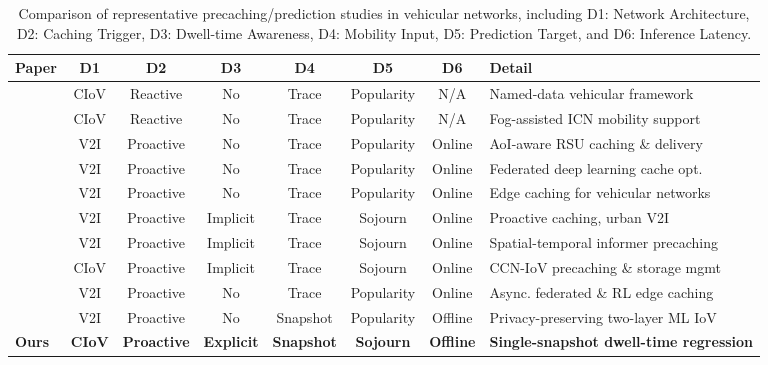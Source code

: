 \documentclass[journal]{IEEEtran}
\begin{document}
\begin{table}[!t]
\centering
\caption{Comparison of representative precaching/prediction studies in vehicular networks, including D1: Network Architecture, D2: Caching Trigger, D3: Dwell-time Awareness, D4: Mobility Input, D5: Prediction Target, and D6: Inference Latency.}
\label{tab:related_work}
\begin{tabular}{@{}lccccccl@{}}
\toprule
\textbf{Paper} & \textbf{D1} & \textbf{D2} & \textbf{D3} & \textbf{D4} & \textbf{D5} & \textbf{D6} & \textbf{Detail} \\
\midrule
\cite{su2017}  & CIoV & Reactive  & No  & Trace    & Popularity & N/A     & Named-data vehicular framework \\
\cite{wang2017}  & CIoV & Reactive  & No  & Trace    & Popularity & N/A     & Fog-assisted ICN mobility support \\
\cite{park2024} & V2I  & Proactive & No  & Trace    & Popularity & Online  & AoI-aware RSU caching \& delivery \\
\cite{khan2025_2} & V2I  & Proactive & No  & Trace    & Popularity & Online  & Federated deep learning cache opt. \\
\cite{su2018} & V2I  & Proactive & No  & Trace    & Popularity & Online  & Edge caching for vehicular networks \\
\cite{feng2023} & V2I  & Proactive & Implicit & Trace & Sojourn  & Online  & Proactive caching, urban V2I \\
\cite{wang2025} & V2I  & Proactive & Implicit & Trace & Sojourn  & Online  & Spatial-temporal informer precaching \\
\cite{nam2025} & CIoV & Proactive & Implicit & Trace & Sojourn  & Online  & CCN-IoV precaching \& storage mgmt \\
\cite{jiang2024} & V2I  & Proactive & No  & Trace    & Popularity & Online  & Async. federated \& RL edge caching \\
\cite{liu2024} & V2I  & Proactive & No  & Snapshot & Popularity & Offline & Privacy-preserving two-layer ML IoV \\
\textbf{Ours} & \textbf{CIoV} & \textbf{Proactive} & \textbf{Explicit} & \textbf{Snapshot} & \textbf{Sojourn} & \textbf{Offline} & \textbf{Single-snapshot dwell-time regression} \\
\bottomrule
\end{tabular}
\end{table}
\end{document}
